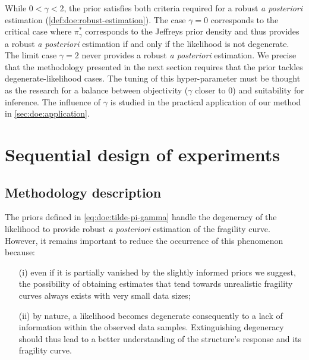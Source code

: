 

While $0<\gamma<2$, the prior satisfies both criteria required for a robust \emph{a posteriori} estimation (\cref{def:doe:robust-estimation}). The case $\gamma=0$ corresponds to the critical case where $\pi^\ast_\gamma$ corresponds to the Jeffreys prior density and thus provides a robust \emph{a posteriori} estimation if and only if the likelihood is not degenerate. The limit case $\gamma=2$ never provides a robust \emph{a posteriori} estimation. We precise that the methodology presented in the next section requires that the prior tackles degenerate-likelihood cases. The tuning of this hyper-parameter must be thought as the research for a balance between objectivity ($\gamma$ closer to $0$) and suitability for inference. The influence of $\gamma$ is studied in the practical application of our method in \cref{sec:doe:application}.











\section{Sequential design of experiments%
}\label{sec:doe:PEmethod}

\subsection{Methodology description}



The priors defined in \cref{eq:doe:tilde-pi-gamma} handle the degeneracy of the likelihood to provide robust \emph{a posteriori} estimation of the fragility curve. However, it remains important to reduce the occurrence of this phenomenon because: %
    \begin{enumerate}
        \item[(i)] even if it is partially vanished by the slightly informed priors we suggest, { the possibility of obtaining estimates that tend towards unrealistic fragility curves always exists with very small data sizes;}
        \item[(ii)] by nature, a likelihood becomes degenerate consequently to a lack of information within the observed data samples. Extinguishing degeneracy should thus lead to a better understanding of the structure's response and its fragility curve.
    \end{enumerate}

